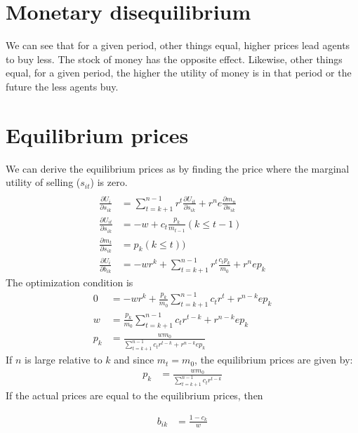 \documentclass[14pt]{article} \usepackage{amsmath}
\begin{document}
\section{Monetary disequilibrium}
We can see that for a given period, other things equal, higher prices lead agents to buy less. 
The stock of money has the opposite effect.
Likewise, other things equal, for a given period, the higher the utility of money is in that period or the future the less agents buy. 
\section{Equilibrium prices}
We can derive the equilibrium prices as by finding the price where the marginal utility of selling ($s_{it}$) is zero. 
\begin{align} 
	\\\frac{ \partial U_i}{\partial s_{ik}} &= \sum\limits_{t=k +1}^{n-1} r^t \frac{\partial U_{it}}{\partial s_{ik}} + r^n e \frac{\partial m_n}{\partial s_{ik}} 
	\\\frac{\partial U_{it}}{\partial s_{ik}} &= -w + c_t \frac{p_k}{m_{t-1}} (k \leq t-1) 
	\\\frac{\partial m_t}{\partial s_{ik}} &= p_k(k \leq t)) 
	\\\frac{\partial U_i}{\partial b_{ik}} &= -w r^k + \sum\limits_{t=k+1}^{n-1} r^t\frac{c_t p_k}{m_0} + r^n e p_k 
\end{align}
The optimization condition is
\begin{align}
	0 &= -w r^k + \frac{ p_k}{m_0}\sum\limits_{t=k+1}^{n-1}c_t r^t + r^{n-k} e p_k 
	\\w &= \frac{ p_k}{m_0}\sum\limits_{t=k+1}^{n-1} c_tr^{t-k}  + r^{n -k}e p_k 
	\\ p_k&= \frac{w m_0 } {\sum\limits_{t=k+1}^{n-1} c_tr^{t-k}  + r^{n -k} e p_k }
\end{align}
If $n$ is large relative to $k$ and since $m_t = m_0$, the equilibrium prices are given by:
\begin{align} 
	 p_k&= \frac{w m_0 } {\sum\limits_{t=k+1}^{n-1} c_tr^{t-k}}
\end{align}
If the actual prices are equal to the equilibrium prices, then 

\begin{align} 
	 b_{ik} &= \frac{1 - c_k } {w}
\end{align}
\end{document}
